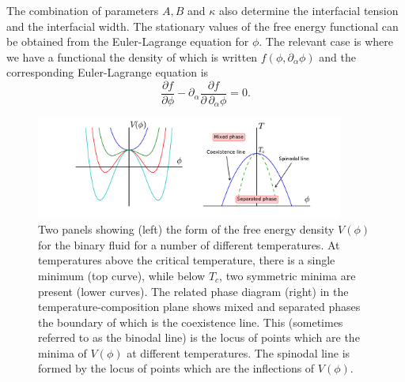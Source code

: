 The combination of parameters $A,B$ and $\kappa$ also determine the
interfacial tension and the interfacial width.
The stationary values of the free energy functional can be obtained
from the Euler-Lagrange equation for $\phi$. The relevant case is
where we have a functional the density of which is written
$f(\phi, \partial_\alpha \phi)$ and the corresponding Euler-Lagrange
equation is
\begin{equation}
\frac{\partial f}{\partial \phi}
- \partial_\alpha \frac{\partial f}{\partial\, \partial_\alpha \phi} = 0.
\end{equation}

\begin{figure}[t]

\includegraphics[width=0.9\textwidth]{figures/symmetric}

\caption{Two panels showing (left) the form of the free energy density
$V(\phi)$ for the binary fluid for a number of different
temperatures. At temperatures above
the critical temperature, there is a single minimum (top curve), while
below $T_c$, two symmetric minima are present (lower curves). The related
phase diagram (right) in the temperature-composition plane shows mixed
and separated phases the boundary of which is the coexistence 
line. This (sometimes referred to as the binodal line) is the locus of
points which are the minima of $V(\phi)$ at different temperatures. The
spinodal line is formed by the locus of points which are the inflections
of $V(\phi)$.}
\label{figure-symmetric-schematic}
\end{figure}


